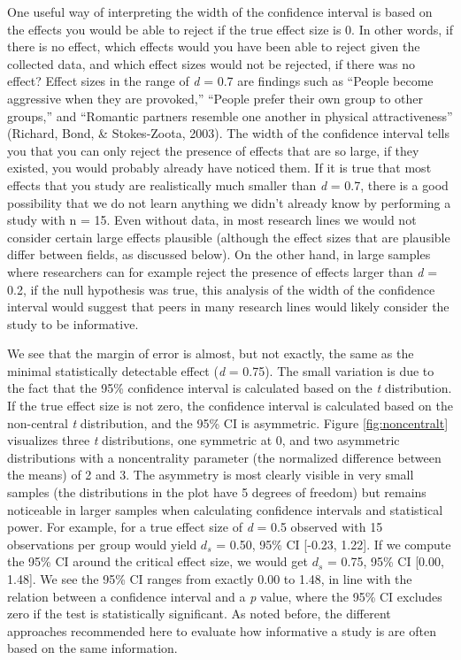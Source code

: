 \documentclass[
  english,
  ,jou,floatsintext]{apa6}
\begin{document}
One useful way of interpreting the width of the confidence interval is based on the effects you would be able to reject if the true effect size is 0. In other words, if there is no effect, which effects would you have been able to reject given the collected data, and which effect sizes would not be rejected, if there was no effect? Effect sizes in the range of \emph{d} = 0.7 are findings such as ``People become aggressive when they are provoked,'' ``People prefer their own group to other groups,'' and ``Romantic partners resemble one another in physical attractiveness'' (Richard, Bond, \& Stokes-Zoota, 2003). The width of the confidence interval tells you that you can only reject the presence of effects that are so large, if they existed, you would probably already have noticed them. If it is true that most effects that you study are realistically much smaller than \emph{d} = 0.7, there is a good possibility that we do not learn anything we didn't already know by performing a study with n = 15. Even without data, in most research lines we would not consider certain large effects plausible (although the effect sizes that are plausible differ between fields, as discussed below). On the other hand, in large samples where researchers can for example reject the presence of effects larger than \emph{d} = 0.2, if the null hypothesis was true, this analysis of the width of the confidence interval would suggest that peers in many research lines would likely consider the study to be informative.

We see that the margin of error is almost, but not exactly, the same as the minimal statistically detectable effect (\emph{d} = 0.75). The small variation is due to the fact that the 95\% confidence interval is calculated based on the \emph{t} distribution. If the true effect size is not zero, the confidence interval is calculated based on the non-central \emph{t} distribution, and the 95\% CI is asymmetric. Figure \ref{fig:noncentralt} visualizes three \emph{t} distributions, one symmetric at 0, and two asymmetric distributions with a noncentrality parameter (the normalized difference between the means) of 2 and 3. The asymmetry is most clearly visible in very small samples (the distributions in the plot have 5 degrees of freedom) but remains noticeable in larger samples when calculating confidence intervals and statistical power. For example, for a true effect size of \emph{d} = 0.5 observed with 15 observations per group would yield \(d_s\) = 0.50, 95\% CI {[}-0.23, 1.22{]}. If we compute the 95\% CI around the critical effect size, we would get \(d_s\) = 0.75, 95\% CI {[}0.00, 1.48{]}. We see the 95\% CI ranges from exactly 0.00 to 1.48, in line with the relation between a confidence interval and a \emph{p} value, where the 95\% CI excludes zero if the test is statistically significant. As noted before, the different approaches recommended here to evaluate how informative a study is are often based on the same information.
\end{document}
